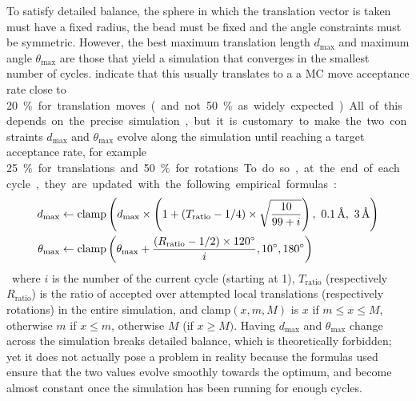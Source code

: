 \documentclass[main.tex]{subfiles}
\begin{document}
To satisfy detailed balance, the sphere in which the translation vector is taken must have a fixed radius, the bead must be fixed and the angle constraints must be symmetric. However, the best maximum translation length $d_{\max}$ and maximum angle $\theta_{\max}$ are those that yield a simulation that converges in the smallest number of cycles. \textcite{FrenkelSmit} indicate that this usually translates to a a MC move acceptance rate close to \qty{20}\% for translation moves (and not \qty{50}\% as widely expected). All of this depends on the precise simulation, but it is customary to make the two constraints $d_{\max}$ and $\theta_{\max}$ evolve along the simulation until reaching a target acceptance rate, for example \qty{25}\% for translations and \qty{50}\% for rotations. To do so, at the end of each cycle, they are updated with the following empirical formulas:
\[\begin{split}
	d_{\max} &\gets \text{clamp}\paren{
		d_{\max}\times\paren{1+\paren{T_\text{ratio} - 1/4}\times\sqrt{\frac{10}{99+i}}},\ \qty{0.1}{\angstrom},\ \qty{3}{\angstrom}
	}\\
	\theta_{\max} &\gets \text{clamp}\paren{\theta_{\max} + \frac{\paren{R_\text{ratio} - 1/2}\times\qty{120}\degree}i, \qty{10}\degree, \qty{180}\degree}
\end{split}\]
where $i$ is the number of the current cycle (starting at 1), $T_\text{ratio}$ (respectively $R_\text{ratio}$) is the ratio of accepted over attempted local translations (respectively rotations) in the entire simulation, and clamp$(x, m, M)$ is $x$ if $m\le x \le M$, otherwise $m$ if $x\le m$, otherwise $M$ (if $x\ge M)$. Having $d_{\max}$ and $\theta_{\max}$ change across the simulation breaks detailed balance, which is theoretically forbidden; yet it does not actually pose a problem in reality because the formulas used ensure that the two values evolve smoothly towards the optimum, and become almost constant once the simulation has been running for enough cycles.
\end{document}
